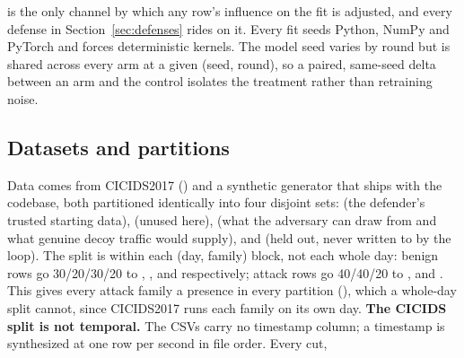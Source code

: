  is the only channel by which any row's influence on the fit is adjusted,
and every defense in Section~\ref{sec:defenses} rides on it.
Every fit seeds Python, NumPy and PyTorch and forces deterministic kernels. The model seed
varies by round but is shared across every arm at a given (seed, round), so a paired,
same-seed delta between an arm and the control isolates the treatment rather than retraining
noise.

\subsection{Datasets and partitions}
Data comes from CICIDS2017 () and a synthetic generator that ships
with the codebase, both partitioned identically into four disjoint sets: 
(the defender's trusted starting data),  (unused here), 
(what the adversary can draw from and what genuine decoy traffic would supply), and
 (held out, never written to by the loop). The split is within each
(day, family) block, not each whole day: benign rows go 30/20/30/20 to ,
,  and  respectively; attack
rows go 40/40/20 to ,  and .
This gives every attack family a presence in every
partition (), which a whole-day split cannot, since CICIDS2017 runs each
family on its own day.
\textbf{The CICIDS split is not temporal.} The  CSVs carry no
timestamp column; a timestamp is synthesized at one row per second in file order. Every cut,
